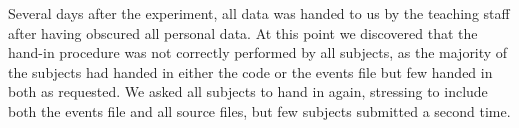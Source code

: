 
Several days after the experiment, all data was handed to us by the teaching staff after having obscured all personal data.
At this point we discovered that the hand-in procedure was not correctly performed by all subjects, as the majority of the subjects had handed in either the code or the events file but few handed in both as requested.
We asked all subjects to hand in again, stressing to include both the events file and all source files, but few subjects submitted a second time. 

